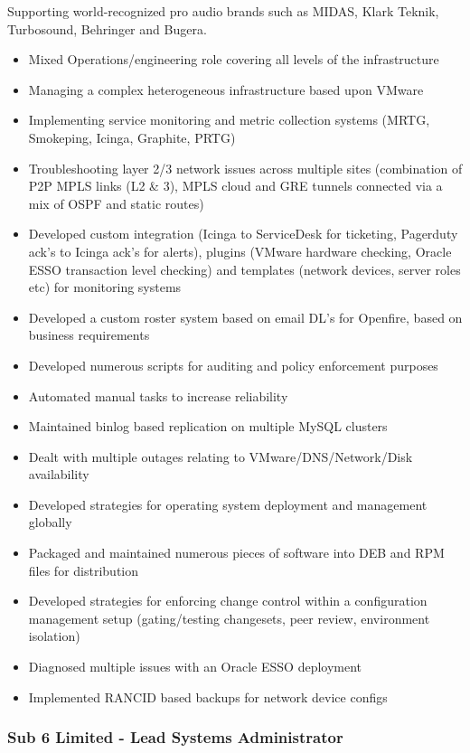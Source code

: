 Supporting world-recognized pro audio brands such as MIDAS, Klark
Teknik, Turbosound, Behringer and Bugera.

\begin{itemize}
\itemsep1pt\parskip0pt
\item
  Mixed Operations/engineering role covering all levels of the
  infrastructure
\item
  Managing a complex heterogeneous infrastructure based upon VMware
\item
  Implementing service monitoring and metric collection systems (MRTG,
  Smokeping, Icinga, Graphite, PRTG)
\item
  Troubleshooting layer 2/3 network issues across multiple sites
  (combination of P2P MPLS links (L2 \& 3), MPLS cloud and GRE tunnels
  connected via a mix of OSPF and static routes)
\item
  Developed custom integration (Icinga to ServiceDesk for ticketing,
  Pagerduty ack's to Icinga ack's for alerts), plugins (VMware hardware
  checking, Oracle ESSO transaction level checking) and templates
  (network devices, server roles etc) for monitoring systems
\item
  Developed a custom roster system based on email DL's for Openfire,
  based on business requirements
\item
  Developed numerous scripts for auditing and policy enforcement
  purposes
\item
  Automated manual tasks to increase reliability
\item
  Maintained binlog based replication on multiple MySQL clusters
\item
  Dealt with multiple outages relating to VMware/DNS/Network/Disk
  availability
\item
  Developed strategies for operating system deployment and management
  globally
\item
  Packaged and maintained numerous pieces of software into DEB and RPM
  files for distribution
\item
  Developed strategies for enforcing change control within a
  configuration management setup (gating/testing changesets, peer
  review, environment isolation)
\item
  Diagnosed multiple issues with an Oracle ESSO deployment
\item
  Implemented RANCID based backups for network device configs
\end{itemize}

\subsubsection{Sub 6 Limited - Lead Systems
Administrator}\label{sub-6-limited---lead-systems-administrator}

